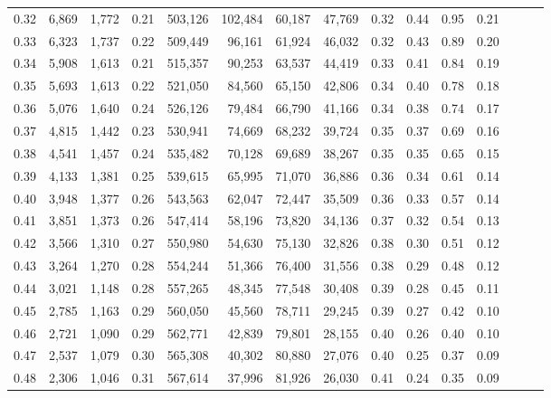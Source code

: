 \begin{tabular}{rrrrrrrrrrrrrrr}
0.32 &   6,869 &  1,772 &  0.21 &  503,126 &  102,484 &   60,187 &   47,769 &  0.32 &  0.44 &  0.95 &      0.21 \\
0.33 &   6,323 &  1,737 &  0.22 &  509,449 &   96,161 &   61,924 &   46,032 &  0.32 &  0.43 &  0.89 &      0.20 \\
0.34 &   5,908 &  1,613 &  0.21 &  515,357 &   90,253 &   63,537 &   44,419 &  0.33 &  0.41 &  0.84 &      0.19 \\
0.35 &   5,693 &  1,613 &  0.22 &  521,050 &   84,560 &   65,150 &   42,806 &  0.34 &  0.40 &  0.78 &      0.18 \\
0.36 &   5,076 &  1,640 &  0.24 &  526,126 &   79,484 &   66,790 &   41,166 &  0.34 &  0.38 &  0.74 &      0.17 \\
0.37 &   4,815 &  1,442 &  0.23 &  530,941 &   74,669 &   68,232 &   39,724 &  0.35 &  0.37 &  0.69 &      0.16 \\
0.38 &   4,541 &  1,457 &  0.24 &  535,482 &   70,128 &   69,689 &   38,267 &  0.35 &  0.35 &  0.65 &      0.15 \\
0.39 &   4,133 &  1,381 &  0.25 &  539,615 &   65,995 &   71,070 &   36,886 &  0.36 &  0.34 &  0.61 &      0.14 \\
0.40 &   3,948 &  1,377 &  0.26 &  543,563 &   62,047 &   72,447 &   35,509 &  0.36 &  0.33 &  0.57 &      0.14 \\
0.41 &   3,851 &  1,373 &  0.26 &  547,414 &   58,196 &   73,820 &   34,136 &  0.37 &  0.32 &  0.54 &      0.13 \\
0.42 &   3,566 &  1,310 &  0.27 &  550,980 &   54,630 &   75,130 &   32,826 &  0.38 &  0.30 &  0.51 &      0.12 \\
0.43 &   3,264 &  1,270 &  0.28 &  554,244 &   51,366 &   76,400 &   31,556 &  0.38 &  0.29 &  0.48 &      0.12 \\
0.44 &   3,021 &  1,148 &  0.28 &  557,265 &   48,345 &   77,548 &   30,408 &  0.39 &  0.28 &  0.45 &      0.11 \\
0.45 &   2,785 &  1,163 &  0.29 &  560,050 &   45,560 &   78,711 &   29,245 &  0.39 &  0.27 &  0.42 &      0.10 \\
0.46 &   2,721 &  1,090 &  0.29 &  562,771 &   42,839 &   79,801 &   28,155 &  0.40 &  0.26 &  0.40 &      0.10 \\
0.47 &   2,537 &  1,079 &  0.30 &  565,308 &   40,302 &   80,880 &   27,076 &  0.40 &  0.25 &  0.37 &      0.09 \\
0.48 &   2,306 &  1,046 &  0.31 &  567,614 &   37,996 &   81,926 &   26,030 &  0.41 &  0.24 &  0.35 &      0.09 \\

\end{tabular}
